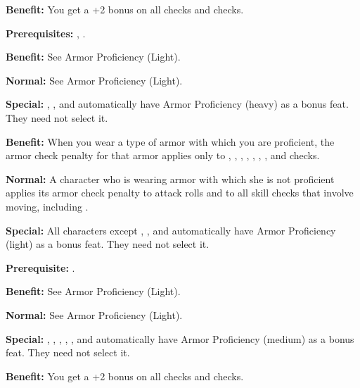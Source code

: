\textbf{Benefit:} You get a +2 bonus on all  checks and  checks.


\textbf{Prerequisites:} , .

\textbf{Benefit:} See Armor Proficiency (Light).

\textbf{Normal:} See Armor Proficiency (Light).

\textbf{Special:} , , and  automatically have Armor Proficiency 
(heavy) as a bonus feat. They need not select it.


\textbf{Benefit:} When you wear a type of armor with which you are proficient, 
the armor check penalty for that armor applies only to , , , 
, , , , and  checks.

\textbf{Normal:} A character who is wearing armor with which she is not proficient 
applies its armor check penalty to attack rolls and to all skill checks that involve 
moving, including .

\textbf{Special:} All characters except , , and  automatically 
have Armor Proficiency (light) as a bonus feat. They need not select it.


\textbf{Prerequisite:} .

\textbf{Benefit:} See Armor Proficiency (Light).

\textbf{Normal:} See Armor Proficiency (Light).

\textbf{Special:} , , , , , and  automatically 
have Armor Proficiency (medium) as a bonus feat. They need not select it.


\textbf{Benefit:} You get a +2 bonus on all  checks and  checks.

